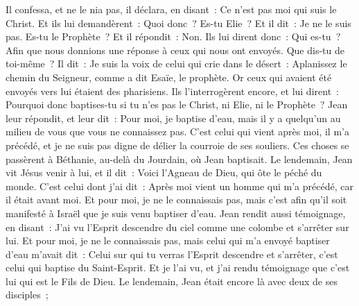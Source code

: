 \begin{multicols}{2}
Il confessa, et ne le nia pas, il déclara, en disant~: Ce n'est pas moi qui suis le Christ.
Et ils lui demandèrent~: Quoi donc~? Es-tu Elie~? Et il dit~: Je ne le suis pas. Es-tu le Prophète~? Et il répondit~: Non.
Ils lui dirent donc~: Qui es-tu~? Afin que nous donnions une réponse à ceux qui nous ont envoyés. Que dis-tu de toi-même~?
Il dit~: Je suis la voix de celui qui crie dans le désert~: Aplanissez le chemin du Seigneur, comme a dit Esaïe, le prophète.
Or ceux qui avaient été envoyés vers lui étaient des pharisiens.
Ils l'interrogèrent encore, et lui dirent~: Pourquoi donc baptises-tu si tu n'es pas le Christ, ni Elie, ni le Prophète~?
Jean leur répondit, et leur dit~: Pour moi, je baptise d'eau, mais il y a quelqu'un au milieu de vous que vous ne connaissez pas.
C'est celui qui vient après moi, il m'a précédé, et je ne suis pas digne de délier la courroie de ses souliers.
Ces choses se passèrent à Béthanie, au-delà du Jourdain, où Jean baptisait.
Le lendemain, Jean vit Jésus venir à lui, et il dit~: Voici l'Agneau de Dieu, qui ôte le péché du monde.
C'est celui dont j'ai dit~: Après moi vient un homme qui m'a précédé, car il était avant moi.
Et pour moi, je ne le connaissais pas, mais c'est afin qu'il soit manifesté à Israël que je suis venu baptiser d'eau.
Jean rendit aussi témoignage, en disant~: J'ai vu l'Esprit descendre du ciel comme une colombe et s'arrêter sur lui.
Et pour moi, je ne le connaissais pas, mais celui qui m'a envoyé baptiser d'eau m'avait dit~: Celui sur qui tu verras l'Esprit descendre et s'arrêter, c'est celui qui baptise du Saint-Esprit.
Et je l'ai vu, et j'ai rendu témoignage que c'est lui qui est le Fils de Dieu.
Le lendemain, Jean était encore là avec deux de ses disciples~;

\end{multicols}
